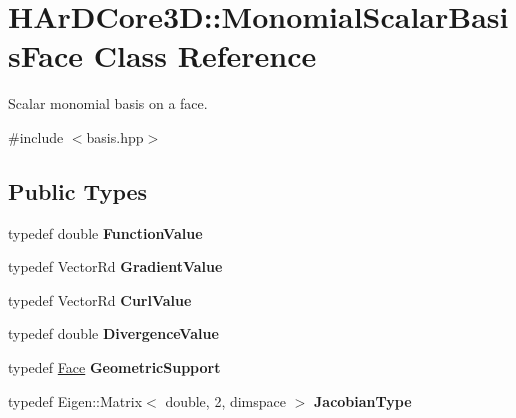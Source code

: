 \hypertarget{classHArDCore3D_1_1MonomialScalarBasisFace}{}\section{H\+Ar\+D\+Core3D\+:\+:Monomial\+Scalar\+Basis\+Face Class Reference}
\label{classHArDCore3D_1_1MonomialScalarBasisFace}


Scalar monomial basis on a face.  




{\ttfamily \#include $<$basis.\+hpp$>$}

\subsection*{Public Types}
\begin{DoxyCompactItemize}
\item 
\mbox{\label{classHArDCore3D_1_1MonomialScalarBasisFace_a71bec97252664e36ca3ad118d9d21c5f}} 
typedef double {\bfseries Function\+Value}
\item 
\mbox{\label{classHArDCore3D_1_1MonomialScalarBasisFace_a43c9548748ae2ffbda2750305a75c4c4}} 
typedef Vector\+Rd {\bfseries Gradient\+Value}
\item 
\mbox{\label{classHArDCore3D_1_1MonomialScalarBasisFace_a1608a0cb98bc4e23f53da80bcc9b898a}} 
typedef Vector\+Rd {\bfseries Curl\+Value}
\item 
\mbox{\label{classHArDCore3D_1_1MonomialScalarBasisFace_a32196c4ba9262b365431669d44277b23}} 
typedef double {\bfseries Divergence\+Value}
\item 
\mbox{\label{classHArDCore3D_1_1MonomialScalarBasisFace_a4d8acdf73dbc7897fe23d219c1fed135}} 
typedef \hyperlink{classHArDCore3D_1_1Face}{Face} {\bfseries Geometric\+Support}
\item 
\mbox{\label{classHArDCore3D_1_1MonomialScalarBasisFace_afe0390024b0b4c5e3581f73ff2a1ece2}} 
typedef Eigen\+::\+Matrix$<$ double, 2, dimspace $>$ {\bfseries Jacobian\+Type}
\end{DoxyCompactItemize}
